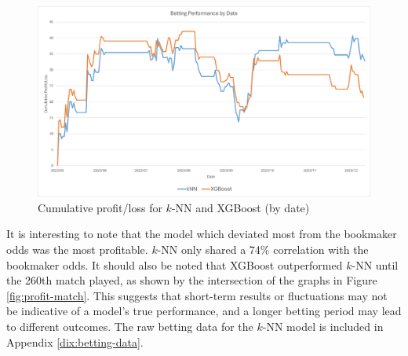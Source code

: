 \begin{figure}[h]
	\centering
	\begin{adjustbox}{center}
		\includegraphics[width=\textwidth]{Figures/profit-date-2.png}
	\end{adjustbox}
	\caption{Cumulative profit/loss for $k$-NN and XGBoost (by date)}
	\label{fig:profit-date}
\end{figure}

It is interesting to note that the model which deviated most from the bookmaker odds was the most profitable. $k$-NN only shared a 74\% correlation with the bookmaker odds. It should also be noted that XGBoost outperformed $k$-NN until the 260th match played, as shown by the intersection of the graphs in Figure \ref{fig:profit-match}. This suggests that short-term results or fluctuations may not be indicative of a model's true performance, and a longer betting period may lead to different outcomes. The raw betting data for the $k$-NN model is included in Appendix \ref{dix:betting-data}.